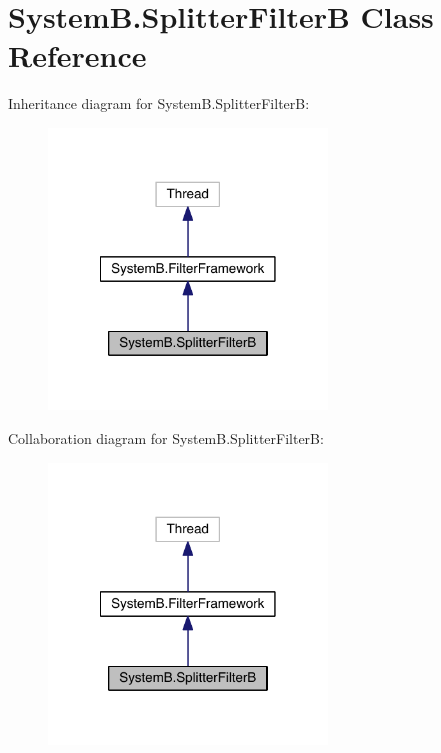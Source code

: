 \hypertarget{class_system_b_1_1_splitter_filter_b}{}\section{System\+B.\+Splitter\+Filter\+B Class Reference}
\label{class_system_b_1_1_splitter_filter_b}


Inheritance diagram for System\+B.\+Splitter\+Filter\+B\+:
\nopagebreak
\begin{figure}[H]
\begin{center}
\leavevmode
\includegraphics[width=210pt]{class_system_b_1_1_splitter_filter_b__inherit__graph}
\end{center}
\end{figure}


Collaboration diagram for System\+B.\+Splitter\+Filter\+B\+:
\nopagebreak
\begin{figure}[H]
\begin{center}
\leavevmode
\includegraphics[width=210pt]{class_system_b_1_1_splitter_filter_b__coll__graph}
\end{center}
\end{figure}

